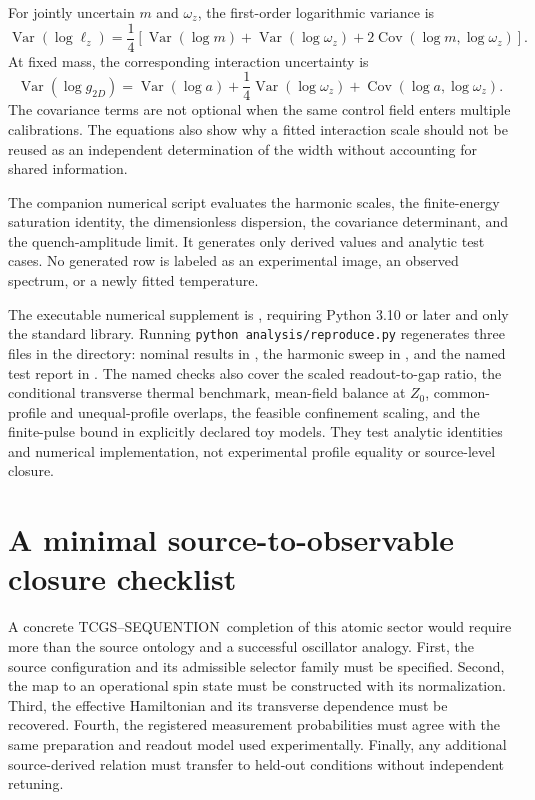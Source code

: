 \documentclass[11pt,a4paper]{article}
\theoremstyle{definition}
\theoremstyle{remark}
\newcommand{\TCGS}{TCGS--SEQUENTION}
\newcommand{\Var}{\operatorname{Var}}
\newcommand{\Cov}{\operatorname{Cov}}
\newcommand{\lop}{\ell_z}
\begin{document}
For jointly uncertain $m$ and $\omega_z$, the first-order logarithmic variance is
\begin{equation}
 \Var(\log\lop)=\frac14\left[
 \Var(\log m)+\Var(\log\omega_z)
 +2\Cov(\log m,\log\omega_z)\right].
 \label{eq:width_uncertainty}
\end{equation}
At fixed mass, the corresponding interaction uncertainty is
\begin{equation}
 \Var(\log g_{2D})
 =\Var(\log a)+\frac14\Var(\log\omega_z)
 +\Cov(\log a,\log\omega_z).
 \label{eq:coupling_uncertainty}
\end{equation}
The covariance terms are not optional when the same control field enters multiple calibrations. The equations also show why a fitted interaction scale should not be reused as an independent determination of the width without accounting for shared information.

The companion numerical script evaluates the harmonic scales, the finite-energy saturation identity, the dimensionless dispersion, the covariance determinant, and the quench-amplitude limit. It generates only derived values and analytic test cases. No generated row is labeled as an experimental image, an observed spectrum, or a newly fitted temperature.

The executable numerical supplement is , requiring Python 3.10 or later and only the standard library. Running \texttt{python analysis/reproduce.py} regenerates three files in the  directory: nominal results in , the harmonic sweep in , and the named test report in . The named checks also cover the scaled readout-to-gap ratio, the conditional transverse thermal benchmark, mean-field balance at $Z_0$, common-profile and unequal-profile overlaps, the feasible confinement scaling, and the finite-pulse bound in explicitly declared toy models. They test analytic identities and numerical implementation, not experimental profile equality or source-level closure.

\section{A minimal source-to-observable closure checklist}
\label{app:closure}
A concrete \TCGS\ completion of this atomic sector would require more than the source ontology and a successful oscillator analogy. First, the source configuration and its admissible selector family must be specified. Second, the map to an operational spin state must be constructed with its normalization. Third, the effective Hamiltonian and its transverse dependence must be recovered. Fourth, the registered measurement probabilities must agree with the same preparation and readout model used experimentally. Finally, any additional source-derived relation must transfer to held-out conditions without independent retuning.\cite{foundation}
\end{document}
